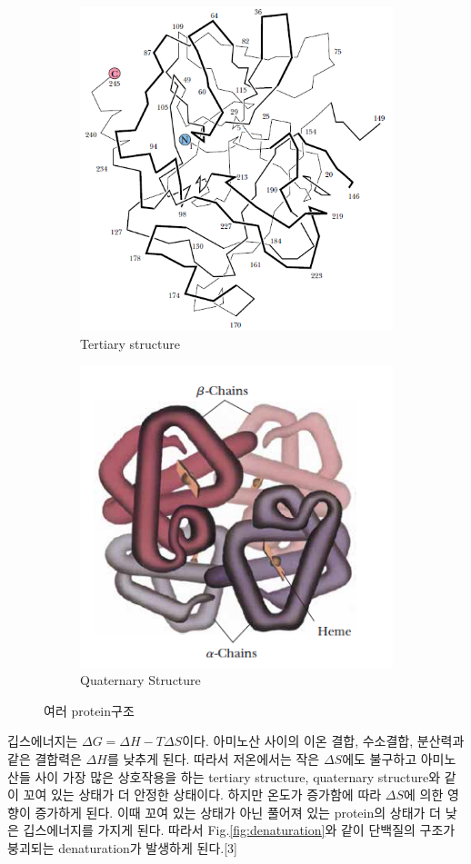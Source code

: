 \documentclass[%
 reprint,
 amsmath,amssymb,
 aps,
]{revtex4-2}
\begin{document}
\begin{figure}[htbp]
	\begin{subfigure}{0.4\textwidth}
		\includegraphics[width = 0.5\linewidth]{Third.png}%
		\caption{\label{fig:Third}Tertiary structure}
	\end{subfigure}
	\begin{subfigure}{0.4\textwidth}
		\includegraphics[width = 0.5\linewidth]{Fourth.png}%
		\caption{\label{fig:Fourth}Quaternary Structure}
	\end{subfigure}
	\caption{\label{fig:Protein}여러 protein구조 }
\end{figure}

깁스에너지는 $\Delta G = \Delta H - T \Delta S$이다. 아미노산 사이의 이온 결합, 수소결합, 분산력과 같은 결합력은 $\Delta H$를 낮추게 된다. 따라서 저온에서는 작은 $\Delta S$에도 불구하고 아미노산들 사이 가장 많은 상호작용을 하는 tertiary structure,  quaternary structure와 같이 꼬여 있는 상태가 더 안정한 상태이다. 하지만 온도가 증가함에 따라 $\Delta S$에 의한 영향이 증가하게 된다. 이때 꼬여 있는 상태가 아닌 풀어져 있는 protein의 상태가 더 낮은 깁스에너지를 가지게 된다. 따라서 Fig.\ref{fig:denaturation}와 같이 단백질의 구조가 붕괴되는 denaturation가 발생하게 된다.[3]
\end{document}

